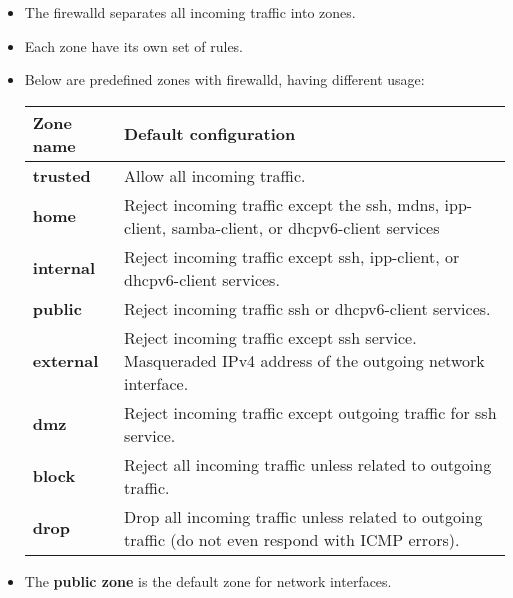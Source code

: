 
\begin{flushleft}
	
	\begin{itemize}
		\item The firewalld separates all incoming traffic into zones.
		\item Each zone have its own set of rules.
		\item Below are predefined zones with firewalld, having different usage:
		\bigskip
			\begin{tabulary}{1.0\textwidth}{|p{13em}|p{13em}|}
			\toprule
			\textbf{Zone name} & \textbf{Default configuration}\\
			\midrule
			\textbf{trusted} & Allow all incoming traffic. \\
			\hline
			\textbf{home} & Reject incoming traffic except the ssh, mdns, ipp-client, samba-client, or dhcpv6-client services \\
			\hline
			\textbf{internal} & Reject incoming traffic except ssh, ipp-client, or dhcpv6-client services. \\
			\hline
			\textbf{public} & Reject incoming traffic ssh or dhcpv6-client services. \\
			\hline
			\textbf{external} & Reject incoming traffic except ssh service. Masqueraded IPv4
			address of the outgoing network interface. \\
			\hline
			\textbf{dmz} & Reject incoming traffic except outgoing traffic for ssh service. \\
			\hline
			\textbf{block}  & Reject all incoming traffic unless related to outgoing traffic. \\
			\hline
			\textbf{drop} & Drop all incoming traffic unless related to outgoing traffic (do not even respond with ICMP errors). \\
			\bottomrule
		\end{tabulary}
		\item The \textbf{public zone} is the default zone for network interfaces.
	\end{itemize}
	
\end{flushleft}

\newpage
